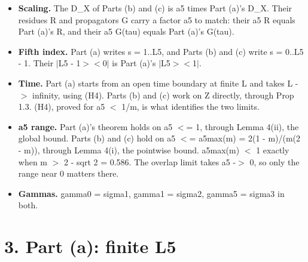 \documentclass[11pt,a4paper]{article}
\begin{document}
\begin{itemize}
\item{} {\bfseries\boldmath Scaling.} The D\_X of Parts (b) and (c) is a5 times Part (a)'s D\_X. Their residues R and propagators G carry a
factor a5 to match: their a5 R equals Part (a)'s R, and their a5 G(tau) equals Part (a)'s G(tau).
\item{} {\bfseries\boldmath Fifth index.} Part (a) writes s = 1..L5, and Parts (b) and (c) write s = 0..L5 - 1. Their $|$L5 - 1$>$$<$0$|$ is
Part (a)'s $|$L5$>$$<$1$|$.
\item{} {\bfseries\boldmath Time.} Part (a) starts from an open time boundary at finite L and takes L -$>$ infinity, using (H4). Parts (b) and
(c) work on Z directly, through Prop 1.3. (H4), proved for a5 $<$ 1/m, is what identifies the two limits.
\item{} {\bfseries\boldmath a5 range.} Part (a)'s theorem holds on a5 $<$= 1, through Lemma 4(ii), the global bound. Parts (b) and (c) hold on
a5 $<$= a5max(m) = 2(1 - m)/(m(2 - m)), through Lemma 4(i), the pointwise bound. a5max(m) $<$ 1 exactly when
m $>$ 2 - sqrt 2 = 0.586. The overlap limit takes a5 -$>$ 0, so only the range near 0 matters there.
\item{} {\bfseries\boldmath Gammas.} gamma0 = sigma1, gamma1 = sigma2, gamma5 = sigma3 in both.
\end{itemize}


\section*{3. Part (a): finite L5}
\end{document}
